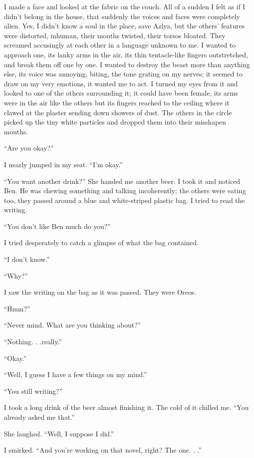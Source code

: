 I made a face and looked at the fabric on the couch. All of a sudden I
felt as if I didn't belong in the house, that suddenly the voices and
faces were completely alien. Yes, I didn't know a soul in the place,
save Azlya, but the others' features were distorted, inhuman, their
mouths twisted, their torsos bloated. They screamed accusingly at each
other in a language unknown to me. I wanted to approach one, its lanky
arms in the air, its thin tentacle-like fingers outstretched, and break
them off one by one. I wanted to destroy the beast more than anything
else, its voice was annoying, biting, the tone grating on my nerves; it
seemed to draw on my very emotions, it wanted me to act. I turned my
eyes from it and looked to one of the others surrounding it; it could
have been female, its arms were in the air like the others but its
fingers reached to the ceiling where it clawed at the plaster sending
down showers of dust. The others in the circle picked up the tiny white
particles and dropped them into their misshapen mouths.

``Are you okay?''

I nearly jumped in my seat. ``I'm okay.''

``You want another drink?'' She handed me another beer. I took it and
noticed Ben. He was chewing something and talking incoherently; the
others were eating too, they passed around a blue and white-striped
plastic bag. I tried to read the writing.

``You don't like Ben much do you?''

I tried desperately to catch a glimpse of what the bag contained.

``I don't know.''

``Why?''

I saw the writing on the bag as it was passed. They were Oreos.

``Hmm?''

``Never mind. What are you thinking about?''

``Nothing. . .really.''

``Okay.''

``Well, I guess I have a few things on my mind.''

``You still writing?''

I took a long drink of the beer almost finishing it. The cold of it
chilled me. ``You already asked me that.''

She laughed. ``Well, I suppose I did.''

I smirked. ``And you're working on that novel, right? The one. . .''

